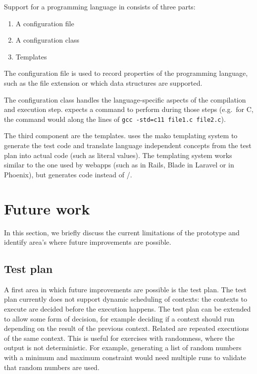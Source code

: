 \documentclass[5p,number]{elsarticle}
\begin{document}
    Support for a programming language in \tested{} consists of three parts:

    \begin{enumerate}
        \item A configuration file
        \item A configuration class
        \item Templates
    \end{enumerate}

    The configuration file is used to record properties of the programming language, such as the file extension or which data structures are supported.

    The configuration class handles the language-specific aspects of the compilation and execution step.
    \tested{} expects a command to perform during those steps (e.g.\ for C, the command would along the lines of \texttt{gcc -std=c11 file1.c file2.c}).

    The third component are the templates.
    \tested{} uses the mako templating system \cite{mako} to generate the test code and translate language independent concepts from the test plan into actual code (such as literal values).
    The templating system works similar to the one used by webapps (such as  in Rails, Blade in Laravel or  in Phoenix), but generates code instead of /.
    
    \section{Future work}\label{sec:future-work}
    
    In this section, we briefly discuss the current limitations of the prototype and identify area's where future improvements are possible.
    
    \subsection{Test plan}\label{subsec:test-plan}

    A first area in which future improvements are possible is the test plan.
    The test plan currently does not support dynamic scheduling of contexts: the contexts to execute are decided before the execution happens.
    The test plan can be extended to allow some form of decision, for example deciding if a context should run depending on the result of the previous context.
    Related are repeated executions of the same context.
    This is useful for exercises with randomness, where the output is not deterministic.
    For example, generating a list of random numbers with a minimum and maximum constraint would need multiple runs to validate that random numbers are used.
    
\end{document}
